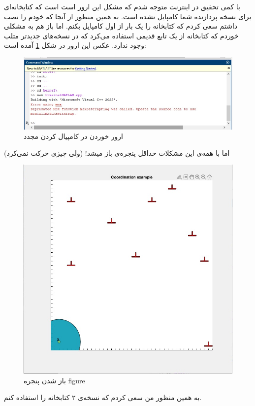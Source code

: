 \documentclass[]{article}
\begin{document}
با کمی تحقیق در اینترنت متوجه شدم که مشکل این ارور است است که کتابخانه‌ای برای نسخه‌ پردازنده شما کامپایل نشده است.
به همین منظور از آنجا که خودم
را نصب داشتم سعی کردم که کتابخانه را یک بار از اول کامپایل بکنم. اما باز هم به مشکلی خوردم که کتابخانه
از یک تابع قدیمی استفاده می‌کرد که در نسخه‌های جدیدتر متلب وجود ندارد. عکس این ارور در شکل
\ref{fig:1.5-error-compile}
آمده است:
\begin{figure}[H]
    \centering
    \includegraphics[scale=0.6]{pics/1.5-error-compile.jpg}
    \caption{ارور خوردن در کامپیال کردن مجدد }
    \label{fig:1.5-error-compile}
\end{figure}
اما با همه‌ی این مشکلات حداقل پنجره‌ی
باز میشد! (ولی چیزی حرکت نمی‌کرد)
\begin{figure}[H]
    \centering
    \includegraphics[scale=0.6]{pics/motes.jpg}
    \caption{باز شدن پنجره figure}
\end{figure}
به همین منظور من سعی کردم که نسخه‌ی ۲ کتابخانه
را استفاده کنم.
\end{document}
